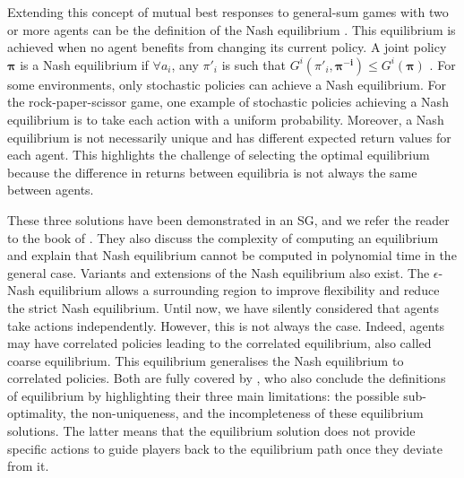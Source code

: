 Extending this concept of mutual best responses to general-sum games with two or more agents can be the definition of the Nash equilibrium \citep{marl-book}.
This equilibrium is achieved when no agent benefits from changing its current policy.
A joint policy $\mathbf{\pi}$ is a Nash equilibrium if $\forall a_i$, any $\pi'_i$ is such that $G^i(\pi'_i , \mathbf{\pi^{-i}}) \le G^i(\mathbf{\pi})$ \citep{nash1950equilibrium}.
For some environments, only stochastic policies can achieve a Nash equilibrium.
For the rock-paper-scissor game, one example of stochastic policies achieving a Nash equilibrium is to take each action with a uniform probability.
Moreover, a Nash equilibrium is not necessarily unique and has different expected return values for each agent.
This highlights the challenge of selecting the optimal equilibrium because the difference in returns between equilibria is not always the same between agents.

These three solutions have been demonstrated in an SG, and we refer the reader to the book of \cite{marl-book}.
They also discuss the complexity of computing an equilibrium and explain that Nash equilibrium cannot be computed in polynomial time in the general case.
Variants and extensions of the Nash equilibrium also exist.
The $\epsilon$-Nash equilibrium allows a surrounding region to improve flexibility and reduce the strict Nash equilibrium.
Until now, we have silently considered that agents take actions independently.
However, this is not always the case.
Indeed, agents may have correlated policies leading to the correlated equilibrium, also called coarse equilibrium.
This equilibrium generalises the Nash equilibrium to correlated policies.
Both are fully covered by \cite{marl-book}, who also conclude the definitions of equilibrium by highlighting their three main limitations: the possible sub-optimality, the non-uniqueness, and the incompleteness of these equilibrium solutions.
The latter means that the equilibrium solution does not provide specific actions to guide players back to the equilibrium path once they deviate from it.

